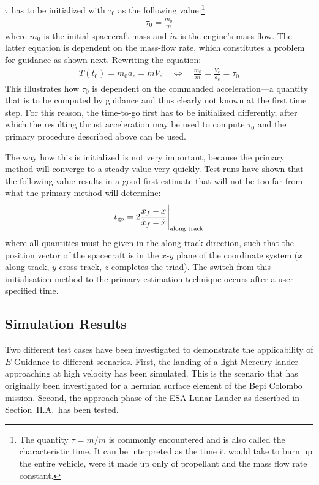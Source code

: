 \documentclass[%
]{aiaa-tc}
\begin{document}
$\tau$ has to be initialized with $\tau_0$ as the following value:\footnote{The
    quantity $\tau = m/\dot{m}$ is commonly encountered and is also called
    the characteristic time. It can be interpreted as the time it would take to
    burn up the entire vehicle, were it made up only of propellant and the mass
    flow rate constant.}
\begin{align}
    \tau_0 = \frac{m_0}{\dot m} 
\end{align}
where $m_0$ is the initial spacecraft mass and $\dot{m}$ is the engine's
mass-flow. The latter equation is dependent on the mass-flow rate, which
constitutes a problem for guidance as shown next. Rewriting the equation:
\begin{align}
    T(t_0) = m_0 a_c = \dot{m} V_e \quad \Leftrightarrow \quad \frac{m_0}{\dot{m}}
    = \frac{V_e}{a_c} = \tau_0 
\end{align}
This illustrates how $\tau_0$ is dependent on the commanded acceleration---a
quantity that is to be computed by guidance and thus clearly not known at the
first time step. For this reason, the time-to-go first has to be initialized
differently, after which the resulting thrust acceleration may be used to
compute $\tau_0$ and the primary procedure described above can be used. 

The way how this is initialized is not very important, because the primary
method will converge to a steady value very quickly. Test runs have shown that
the following value results in a good first estimate that will not be too far
from what the primary method will determine:
\begin{align}
    t_{\text{go}} = 2\frac{x_f-x}{\dot{x}_f - \dot{x}} \Bigg|_{\text{along track}} 
\end{align}
where all quantities must be given in the along-track direction, such that the
position vector of the spacecraft is in the $x$-$y$ plane of the coordinate
system ($x$ along track, $y$ cross track, $z$ completes the triad). The switch
from this initialisation method to the primary estimation technique occurs after
a user-specified time. 


\subsection{Simulation Results}

Two different test cases have been investigated to demonstrate the applicability
of $E$-Guidance to different scenarios. First, the landing of a light Mercury
lander approaching at high velocity has been simulated. This is the scenario
that has originally been investigated for a hermian surface element of the
Bepi Colombo mission.\cite{Novara2002} Second, the approach
phase of the ESA Lunar Lander as described in Section~II.A.\ has been tested. 
\end{document}
